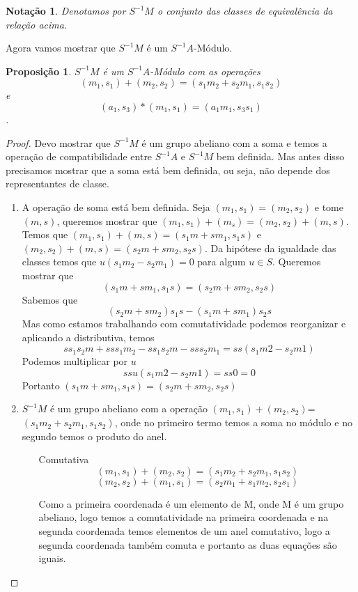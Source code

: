 \documentclass[10pt,a4paper]{article}
\newtheorem{proposition}[theorem]{Proposição}
\newtheorem{notation}[theorem]{Notação}
\begin{document}
\begin{notation}
	Denotamos por $S^{-1}M$ o conjunto das classes de equivalência da relação acima.
\end{notation}

Agora vamos mostrar que $S^{-1}M$ é um $S^{-1}A$-Módulo.

\begin{proposition}
	$S^{-1}M$ é um $S^{-1}A$-Módulo com as operações $$(m_1,s_1)+(m_2,s_2)=(s_1m_2+s_2m_1,s_1s_2)$$ e $$(a_1,s_3)*(m_1,s_1)=(a_1m_1,s_3s_1)$$.
\end{proposition}

\begin{proof}
	Devo mostrar que $S^{-1}M$ é um grupo abeliano com a soma e temos a operação de compatibilidade entre $S^{-1}A$ e $S^{-1}M$ bem definida. Mas antes disso precisamos mostrar que a soma está bem definida, ou seja, não depende dos representantes de classe.
	
	\begin{enumerate}
		\item A operação de soma está bem definida. Seja $(m_1,s_1)=(m_2,s_2)$ e tome $(m,s)$, queremos mostrar que $(m_1,s_1)+(m_s)=(m_2,s_2)+(m,s)$.
		Temos que $(m_1,s_1)+(m,s)=(s_1m+sm_1,s_1s)$ e $(m_2,s_2)+(m,s)=(s_2m+sm_2,s_2s)$. Da hipótese da igualdade das classes temos que $u(s_1m_2-s_2m_1)=0$ para algum $u \in S$.
		Queremos mostrar que
		$$(s_1m+sm_1,s_1s)=(s_2m+sm_2,s_2s)$$
		Sabemos que $$(s_2m+sm_2)s_1s-(s_1m+sm_1)s_2s$$
		Mas como estamos trabalhando com comutatividade podemos reorganizar e aplicando a distributiva, temos
		$$ss_1s_2m+sss_1m_2-ss_1s_2m-sss_2m_1=ss(s_1m2-s_2m1)$$
		Podemos multiplicar por $u$
		$$ssu(s_1m2-s_2m1)=ss0=0$$
		Portanto $(s_1m+sm_1,s_1s)=(s_2m+sm_2,s_2s)$
		
		\item $S^{-1}M$ é um grupo abeliano com a operação $(m_1,s_1)+(m_2,s_2)$=$(s_1m_2+s_2m_1,s_1s_2)$, onde no primeiro termo temos a soma no módulo e no segundo temos o produto do anel.
		
		\begin{enumerate}
			\item [Comutativa] $$(m_1,s_1)+(m_2,s_2) = (s_1m_2+s_2m_1,s_1s_2)$$
			$$(m_2,s_2)+(m_1,s_1) = (s_2m_1+s_1m_2,s_2s_1)$$
			
			Como a primeira coordenada é um elemento de M, onde M é um grupo abeliano, logo temos a comutatividade na primeira coordenada e na segunda coordenada temos elementos de um anel comutativo, logo a segunda coordenada também comuta e portanto as duas equações são iguais.
			

\end{enumerate}
\end{enumerate}
\end{proof}
\end{document}
